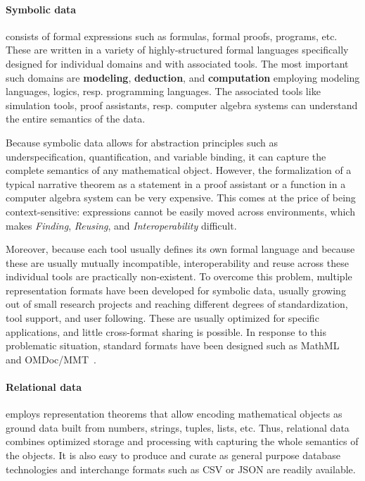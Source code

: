 \paragraph*{Symbolic data} consists of formal expressions such as formulas, formal proofs, programs, etc.
These are written in a variety of highly-structured formal languages specifically designed for individual domains and with associated tools.
The most important such domains are \textbf{modeling}, \textbf{deduction}, and \textbf{computation} employing modeling languages, logics, resp. programming languages.
The associated tools like simulation tools, proof assistants, resp. computer algebra systems can understand the entire semantics of the data.

Because symbolic data allows for abstraction principles such as underspecification, quantification, and variable binding, it can capture the complete semantics of any mathematical object.
However, the formalization of a typical narrative theorem as a statement in a proof assistant or a function in a computer algebra system can be very expensive.
This comes at the price of being context-sensitive: expressions cannot be easily moved across environments, which makes \emph{Finding}, \emph{Reusing}, and \emph{Interoperability} difficult.

Moreover, because each tool usually defines its own formal language and because these are usually mutually incompatible, interoperability and reuse across these individual tools are practically non-existent.
To overcome this problem, multiple representation formats have been developed for symbolic data, usually growing out of small research projects and reaching different degrees of standardization, tool support, and user following.
These are usually optimized for specific applications, and little cross-format sharing is possible.
In response to this problematic situation, standard formats have been designed such as MathML~\cite{CarlisleEd:MathML3:on} and OMDoc/MMT~\cite{uniformal:on}.

\paragraph{Relational data} employs representation theorems that allow encoding mathematical objects as ground data built from numbers, strings, tuples, lists, etc.
Thus, relational data combines optimized storage and processing with capturing the whole semantics of the objects.
It is also easy to produce and curate as general purpose database technologies and interchange formats such as CSV or JSON are readily available.

